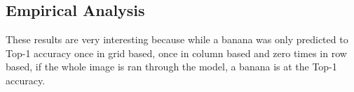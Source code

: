 \subsection*{Empirical Analysis}
These results are very interesting because while a banana was only predicted to
Top-1 accuracy once in grid based, once in column based and zero times in row
based, if the whole image is ran through the model, a banana is at the Top-1 accuracy.

























